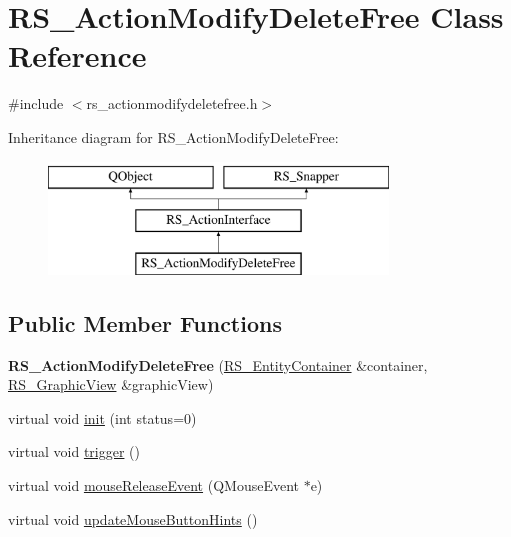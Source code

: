 \hypertarget{classRS__ActionModifyDeleteFree}{\section{R\-S\-\_\-\-Action\-Modify\-Delete\-Free Class Reference}
\label{classRS__ActionModifyDeleteFree}
}


{\ttfamily \#include $<$rs\-\_\-actionmodifydeletefree.\-h$>$}

Inheritance diagram for R\-S\-\_\-\-Action\-Modify\-Delete\-Free\-:\begin{figure}[H]
\begin{center}
\leavevmode
\includegraphics[height=3.000000cm]{classRS__ActionModifyDeleteFree}
\end{center}
\end{figure}
\subsection*{Public Member Functions}
\begin{DoxyCompactItemize}
\item 
\hypertarget{classRS__ActionModifyDeleteFree_a2555322700ccc5d8707c2dcff87e27f3}{{\bfseries R\-S\-\_\-\-Action\-Modify\-Delete\-Free} (\hyperlink{classRS__EntityContainer}{R\-S\-\_\-\-Entity\-Container} \&container, \hyperlink{classRS__GraphicView}{R\-S\-\_\-\-Graphic\-View} \&graphic\-View)}\label{classRS__ActionModifyDeleteFree_a2555322700ccc5d8707c2dcff87e27f3}

\item 
virtual void \hyperlink{classRS__ActionModifyDeleteFree_a71d68fe1a251bbb45d8e4256ebf0d21c}{init} (int status=0)
\item 
virtual void \hyperlink{classRS__ActionModifyDeleteFree_a3b09bc934ba7431dab18f4598395d973}{trigger} ()
\item 
virtual void \hyperlink{classRS__ActionModifyDeleteFree_a5effa8e73e190ff1e91ba2644cd8f81e}{mouse\-Release\-Event} (Q\-Mouse\-Event $\ast$e)
\item 
virtual void \hyperlink{classRS__ActionModifyDeleteFree_a3cb1761253e514b65b2697efd17c70cb}{update\-Mouse\-Button\-Hints} ()
\end{DoxyCompactItemize}
